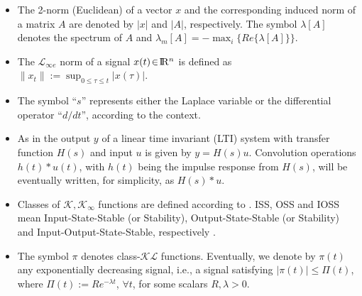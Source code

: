 \documentclass[letterpaper, 10 pt, conference]{ieeeconf}  %
\def\re{{\rm I}\! {\rm R}}
\theoremstyle{plain}
\theoremstyle{definition}
\theoremstyle{remark}
\begin{document}

\begin{itemize}

\item The 2-norm (Euclidean) of a vector $x$ and the corresponding
induced norm of a matrix $A$ are denoted by $|x|$ and $|A|$,
respectively. The symbol $\lambda[A]$ denotes the spectrum of $A$
and $\lambda_m[A]=-\max_i\{Re\{\lambda[A]\}\}$.


\item The ${\mathcal{L}}_{\infty e}$ norm of a signal
$x(t)\!\in\!\re^n$ is defined as
$\|x_{t}\|\!:=\!\sup_{0\!\leq\!\tau\!\leq\!t} |x(\tau)|$.


\item  The symbol  ``$s$'' represents either the
Laplace variable or the differential operator ``$d/dt$'', according
to the context. 

\item As in \cite{IS:96} the output $y$ of a linear time invariant (LTI) system with transfer function
$H(s)$ and input $u$ is given by $y=H(s)u$. Convolution operations $h(t)*u(t)$, with $h(t)$ being the impulse response from $H(s)$, will be eventually written, for simplicity, as $H(s)*u$.


\item Classes of $\mathcal{K}, \mathcal{K}_\infty$ functions are
defined according to \cite[p.~144]{K:02}. ISS, OSS and IOSS mean
Input-State-Stable (or Stability), Output-State-Stable (or
Stability) and Input-Output-State-Stable, respectively
\cite{SW:95}.


\item The symbol $\pi$ denotes class-$\mathcal{KL}$ functions. Eventually, we denote by $\pi (t)$ any exponentially decreasing signal, i.e., a signal satisfying $|\pi(t)| \leq \Pi(t)$, where $\Pi(t):=R e^{-\lambda t}$, $\forall t$, for  some scalars $R,\lambda>0$.
\end{itemize}

\end{document}
